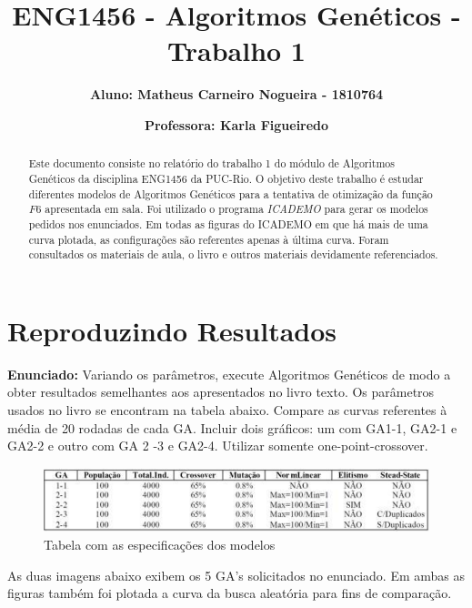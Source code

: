 \documentclass[12pt]{article}
\title{\textbf{ENG1456 - Algoritmos Genéticos - Trabalho 1}}
\author{\textbf{Aluno: Matheus Carneiro Nogueira - 1810764}}
\affil{}
\author{\textbf{Professora: Karla Figueiredo}}
\affil{}
\date{}
\begin{document}
	\maketitle
	\tableofcontents
	
	
	\begin{abstract}
		Este documento consiste no relatório do trabalho 1 do módulo de Algoritmos Genéticos da disciplina ENG1456 da PUC-Rio. O objetivo deste trabalho é estudar diferentes modelos de Algoritmos Genéticos para a tentativa de otimização da função $F6$ apresentada em sala. Foi utilizado o programa \textit{ICADEMO} para gerar os modelos pedidos nos enunciados. Em todas as figuras do ICADEMO em que há mais de uma curva plotada, as configurações são referentes apenas à última curva. Foram consultados os materiais de aula, o livro \cite{davis1991handbook} e outros materiais devidamente referenciados.
	\end{abstract}
	
\section{Reproduzindo Resultados}

\textbf{Enunciado:}
Variando os parâmetros, execute Algoritmos Genéticos de modo a obter resultados semelhantes aos apresentados no livro texto. Os parâmetros usados no livro se encontram na tabela abaixo. Compare as curvas referentes à média de 20 rodadas de cada GA. Incluir dois gráficos: um com GA1-1, GA2-1 e GA2-2 e outro com GA 2 -3 e GA2-4. Utilizar somente one-point-crossover.

\begin{figure}[H]
	\centering
	\includegraphics[width=0.9\linewidth]{Imagens/tabela_especificacao_modelos}
	\caption{Tabela com as especificações dos modelos}
	\label{fig:tabelaespecificacaomodelos}
\end{figure}


As duas imagens abaixo exibem os 5 GA's solicitados no enunciado. Em ambas as figuras também foi plotada a curva da busca aleatória para fins de comparação.
\end{document}
